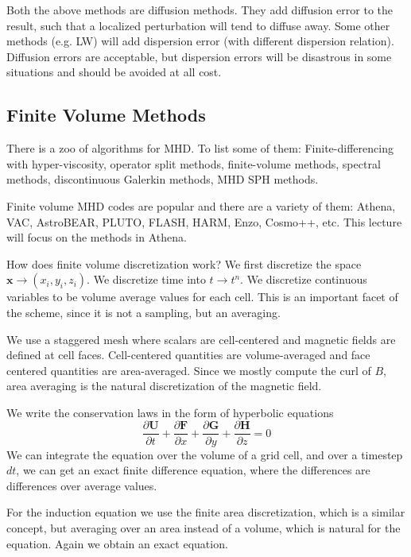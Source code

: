 \documentclass[letterpaper, 11pt]{article}
\numberwithin{equation}{section}
\numberwithin{figure}{section}
\begin{document}
Both the above methods are diffusion methods. They add diffusion error to the
result, such that a localized perturbation will tend to diffuse away. Some other
methods (e.g. LW) will add dispersion error (with different dispersion
relation). Diffusion errors are acceptable, but dispersion errors will be
disastrous in some situations and should be avoided at all cost.

\subsection{Finite Volume Methods}

There is a zoo of algorithms for MHD. To list some of them: Finite-differencing
with hyper-viscosity, operator split methods, finite-volume methods, spectral
methods, discontinuous Galerkin methods, MHD SPH methods.

Finite volume MHD codes are popular and there are a variety of them: Athena,
VAC, AstroBEAR, PLUTO, FLASH, HARM, Enzo, Cosmo++, etc. This lecture will focus
on the methods in Athena.

How does finite volume discretization work? We first discretize the space
$\mathbf{x} \rightarrow (x_i, y_i, z_i)$. We discretize time into $t \rightarrow
t^n$. We discretize continuous variables to be volume average values for each
cell. This is an important facet of the scheme, since it is not a sampling, but
an averaging.

We use a staggered mesh where scalars are cell-centered and magnetic fields are
defined at cell faces. Cell-centered quantities are volume-averaged and face
centered quantities are area-averaged. Since we mostly compute the curl of $B$,
area averaging is the natural discretization of the magnetic field.

We write the conservation laws in the form of hyperbolic equations
\begin{equation}
  \label{eq:12}
  \frac{\partial \mathbf{U}}{\partial t} + \frac{\partial \mathbf{F}}{\partial x} + \frac{\partial \mathbf{G}}{\partial y} + \frac{\partial \mathbf{H}}{\partial z} = 0
\end{equation}
We can integrate the equation over the volume of a grid cell, and over a
timestep $dt$, we can get an exact finite difference equation, where the
differences are differences over average values.

For the induction equation we use the finite area discretization, which is a
similar concept, but averaging over an area instead of a volume, which is
natural for the equation. Again we obtain an exact equation.
\end{document}
